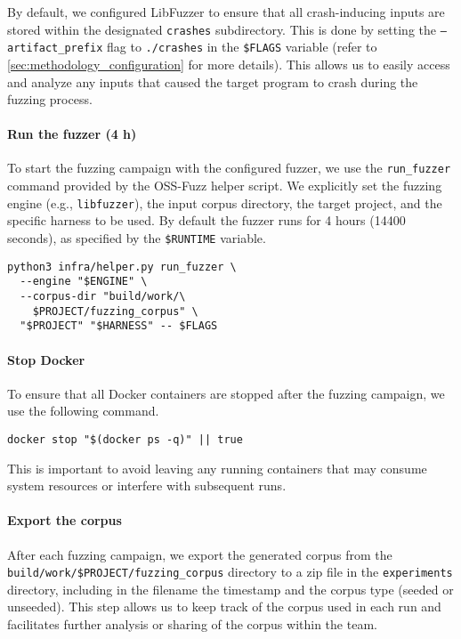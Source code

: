 By default, we configured LibFuzzer to ensure that all crash-inducing inputs are stored within the designated \texttt{crashes} subdirectory. This is done by setting the \texttt{---artifact\_prefix} flag to \texttt{./crashes} in the \texttt{\$FLAGS} variable (refer to \autoref{sec:methodology_configuration} for more details). This allows us to easily access and analyze any inputs that caused the target program to crash during the fuzzing process.

\noindent \paragraph{Run the fuzzer (4 h)}

To start the fuzzing campaign with the configured fuzzer, we use the \texttt{run\_fuzzer} command provided by the OSS-Fuzz helper script. We explicitly set the fuzzing engine (e.g., \texttt{libfuzzer}), the input corpus directory, the target project, and the specific harness to be used. By default the fuzzer runs for 4 hours (14400 seconds), as specified by the \texttt{\$RUNTIME} variable.

\begin{verbatim}
python3 infra/helper.py run_fuzzer \
  --engine "$ENGINE" \
  --corpus-dir "build/work/\
    $PROJECT/fuzzing_corpus" \
  "$PROJECT" "$HARNESS" -- $FLAGS
    \end{verbatim}

\noindent \paragraph{Stop Docker}

To ensure that all Docker containers are stopped after the fuzzing campaign, we use the following command.

\begin{verbatim}
docker stop "$(docker ps -q)" || true
    \end{verbatim}

This is important to avoid leaving any running containers that may consume system resources or interfere with subsequent runs.

\noindent \paragraph{Export the corpus}

After each fuzzing campaign, we export the generated corpus from the \texttt{build/work/\$PROJECT/fuzzing\_corpus} directory to a zip file in the \texttt{experiments} directory, including in the filename the timestamp and the corpus type (seeded or unseeded). This step allows us to keep track of the corpus used in each run and facilitates further analysis or sharing of the corpus within the team.

